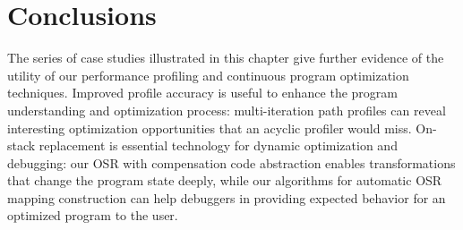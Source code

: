 \section{Conclusions}
The series of case studies illustrated in this chapter give further evidence of the utility of our performance profiling and continuous program optimization techniques. Improved profile accuracy is useful to enhance the program understanding and optimization process: multi-iteration path profiles can reveal interesting optimization opportunities that an acyclic profiler would miss. On-stack replacement is essential technology for dynamic optimization and debugging: our OSR with compensation code abstraction enables transformations that change the program state deeply, while our algorithms for automatic OSR mapping construction can help debuggers in providing expected behavior for an optimized program to the user.